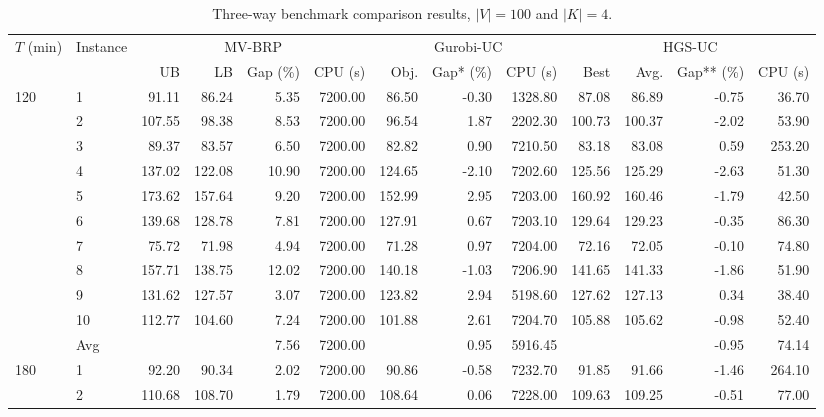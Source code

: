 \documentclass[11pt]{article}
\numberwithin{table}{section}
\numberwithin{figure}{section}
\begin{document}
\begin{landscape}
\begin{table}[p]
\centering
\caption{Three-way benchmark comparison results, $\mid V\mid =100$ and $\left| K \right|=4$.}
\label{tab:benchmark-100}
\scriptsize
\setlength{\tabcolsep}{3pt}
\begin{adjustbox}{max width=\linewidth}
\begin{tabular}{llrrrrrrr rrrr}
\toprule
\multirow{2}{*}{$T$ (min)} & \multirow{2}{*}{Instance} & \multicolumn{4}{c}{MV-BRP} & \multicolumn{3}{c}{Gurobi-UC} & \multicolumn{4}{c}{HGS-UC} \\
\cmidrule(lr){3-6}\cmidrule(lr){7-9}\cmidrule(lr){10-13}
& & UB & LB & Gap (\%) & CPU (s) & Obj. & Gap* (\%) & CPU (s) & Best & Avg. & Gap** (\%) & CPU (s) \\
\midrule
120 & 1 & 91.11 & 86.24 & 5.35 & 7200.00 & 86.50 & -0.30 & 1328.80 & 87.08 & 86.89 & -0.75 & 36.70 \\
 & 2 & 107.55 & 98.38 & 8.53 & 7200.00 & 96.54 & 1.87 & 2202.30 & 100.73 & 100.37 & -2.02 & 53.90 \\
 & 3 & 89.37 & 83.57 & 6.50 & 7200.00 & 82.82 & 0.90 & 7210.50 & 83.18 & 83.08 & 0.59 & 253.20 \\
 & 4 & 137.02 & 122.08 & 10.90 & 7200.00 & 124.65 & -2.10 & 7202.60 & 125.56 & 125.29 & -2.63 & 51.30 \\
 & 5 & 173.62 & 157.64 & 9.20 & 7200.00 & 152.99 & 2.95 & 7203.00 & 160.92 & 160.46 & -1.79 & 42.50 \\
 & 6 & 139.68 & 128.78 & 7.81 & 7200.00 & 127.91 & 0.67 & 7203.10 & 129.64 & 129.23 & -0.35 & 86.30 \\
 & 7 & 75.72 & 71.98 & 4.94 & 7200.00 & 71.28 & 0.97 & 7204.00 & 72.16 & 72.05 & -0.10 & 74.80 \\
 & 8 & 157.71 & 138.75 & 12.02 & 7200.00 & 140.18 & -1.03 & 7206.90 & 141.65 & 141.33 & -1.86 & 51.90 \\
 & 9 & 131.62 & 127.57 & 3.07 & 7200.00 & 123.82 & 2.94 & 5198.60 & 127.62 & 127.13 & 0.34 & 38.40 \\
 & 10 & 112.77 & 104.60 & 7.24 & 7200.00 & 101.88 & 2.61 & 7204.70 & 105.88 & 105.62 & -0.98 & 52.40 \\
\midrule
 & Avg &  &  & 7.56 & 7200.00 &  & 0.95 & 5916.45 &  &  & -0.95 & 74.14 \\
180 & 1 & 92.20 & 90.34 & 2.02 & 7200.00 & 90.86 & -0.58 & 7232.70 & 91.85 & 91.66 & -1.46 & 264.10 \\
 & 2 & 110.68 & 108.70 & 1.79 & 7200.00 & 108.64 & 0.06 & 7228.00 & 109.63 & 109.25 & -0.51 & 77.00 \\

\end{tabular}
\end{adjustbox}
\end{table}
\end{landscape}
\end{document}
